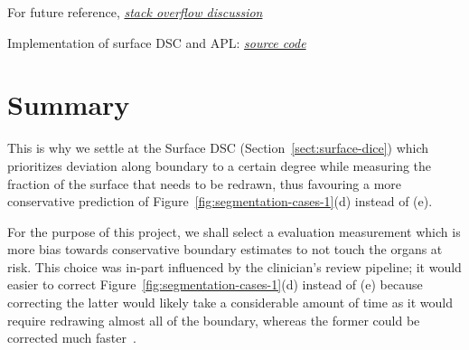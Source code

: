 \documentclass[12pt,twoside]{report}
\begin{document}
\begin{warning}
  For future reference, \textit{\href{https://stackoverflow.com/questions/73286639/how-to-calculate-added-path-length-apl-image-segmentation-metric}{stack overflow discussion}}

  Implementation of surface DSC and APL: \textit{\href{https://github.com/pyplati/platipy/blob/master/platipy/imaging/label/comparison.py}{source code}}
\end{warning}

\section{Summary}

This is why we settle at the Surface DSC (Section~\ref{sect:surface-dice}) which prioritizes deviation along boundary to a certain degree while measuring the fraction of the surface that needs to be redrawn, thus favouring a more conservative prediction of Figure~\ref{fig:segmentation-cases-1}(d) instead of (e).

For the purpose of this project, we shall select a evaluation measurement which is more bias towards conservative boundary estimates to not touch the organs at risk. This choice was in-part influenced by the clinician's review pipeline; it would easier to correct Figure~\ref{fig:segmentation-cases-1}(d) instead of (e) because correcting the latter would likely take a considerable amount of time as it would require redrawing almost all of the boundary, whereas the former could be corrected much faster~\cite{Nikolov2021-xe}.



\end{document}
